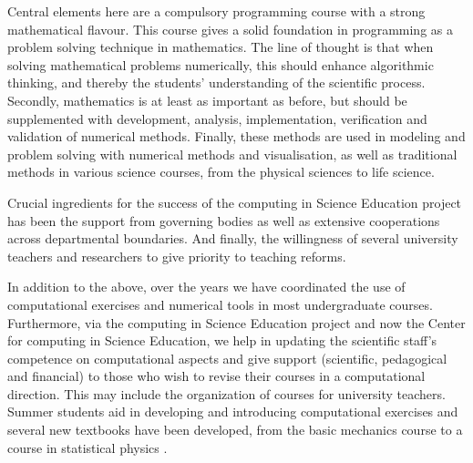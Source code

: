 \documentclass[graybox,envcountchap,sectrefs]{svmult}
\begin{document}
Central elements here are a compulsory programming course with a
strong mathematical flavour. This course gives a solid foundation in
programming as a problem solving technique in mathematics. The line of
thought is that when solving mathematical problems numerically, this should enhance
algorithmic thinking, and thereby the students' understanding of the
scientific process.  Secondly, mathematics is at least as important as
before, but should be supplemented with development, analysis,
implementation, verification and validation of numerical
methods. Finally, these methods are used in modeling and problem
solving with numerical methods and visualisation, as well as
traditional methods in various science courses, from the physical
sciences to life science.

Crucial ingredients for the success of the computing in Science
Education project has been the support from governing bodies as well
as extensive cooperations across departmental boundaries. And finally,
the willingness of several university teachers and researchers to give
priority to teaching reforms.

In addition to the above, over the years we have coordinated the use
of computational exercises and numerical tools in most undergraduate
courses. Furthermore, via the computing in Science Education project
and now the Center for computing in Science Education, we help in
updating the scientific staff's competence on computational aspects
and give support (scientific, pedagogical and financial) to those who
wish to revise their courses in a computational direction. This may
include the organization of courses for university teachers. Summer
students aid in developing and introducing computational exercises and
several new textbooks have been developed, from the basic mechanics
course to a course in statistical physics \cite{AMS2015, AIV2018,AMSDS2019}.
\end{document}

